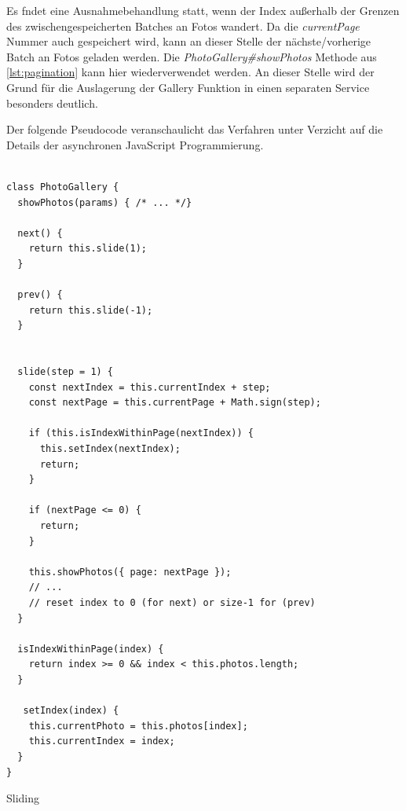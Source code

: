 Es fndet eine Ausnahmebehandlung statt, wenn der Index außerhalb der Grenzen des zwischengespeicherten Batches an Fotos wandert. Da die \textit{currentPage} Nummer auch gespeichert wird, kann an dieser Stelle der nächste/vorherige Batch an Fotos geladen werden. Die \textit{PhotoGallery\#showPhotos} Methode aus \ref{lst:pagination} kann hier wiederverwendet werden. An dieser Stelle wird der Grund für die Auslagerung der Gallery Funktion in einen separaten Service besonders deutlich.

Der folgende Pseudocode veranschaulicht das Verfahren unter Verzicht auf die Details der asynchronen JavaScript Programmierung.

\begin{listing}[H]
\begin{verbatim}

class PhotoGallery {
  showPhotos(params) { /* ... */}

  next() {
    return this.slide(1);
  }

  prev() {
    return this.slide(-1);
  }


  slide(step = 1) {
    const nextIndex = this.currentIndex + step;
    const nextPage = this.currentPage + Math.sign(step);

    if (this.isIndexWithinPage(nextIndex)) {
      this.setIndex(nextIndex);
      return;
    }

    if (nextPage <= 0) {
      return;
    }

    this.showPhotos({ page: nextPage });
    // ... 
    // reset index to 0 (for next) or size-1 for (prev)  
  }

  isIndexWithinPage(index) {
    return index >= 0 && index < this.photos.length;
  }

   setIndex(index) {
    this.currentPhoto = this.photos[index];
    this.currentIndex = index;
  }
}

\end{verbatim}
\caption{Sliding}
\label{lst:sliding}
\end{listing} 
